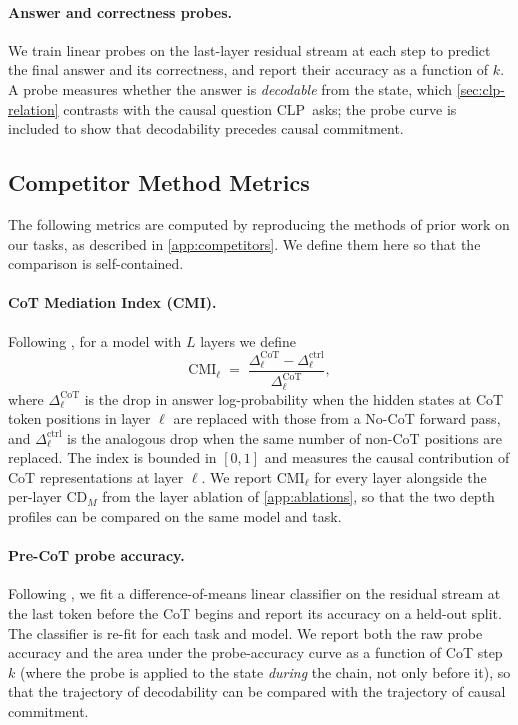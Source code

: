 \documentclass[11pt]{article}
\newcommand{\CDM}{\mathrm{CD}_{M}}
\newcommand{\stepk}{k}
\newcommand{\CLP}{\textsc{CLP}}
\begin{document}
\paragraph{Answer and correctness probes.} We train linear probes on the
last-layer residual stream at each step to predict the final answer and its
correctness, and report their accuracy as a function of $\stepk$. A probe
measures whether the answer is \emph{decodable} from the state, which
\cref{sec:clp-relation} contrasts with the causal question \CLP\ asks; the probe
curve is included to show that decodability precedes causal commitment.

\subsection{Competitor Method Metrics}
\label{app:metrics-competitors}

The following metrics are computed by reproducing the methods of prior work on
our tasks, as described in \cref{app:competitors}. We define them here so that
the comparison is self-contained.

\paragraph{CoT Mediation Index (CMI).}
Following \citet{DBLP:journals/corr/abs-2602-03994}, for a model with $L$ layers we define
\begin{equation}
\label{eq:cmi}
\mathrm{CMI}_{\ell} \;=\;
\frac{\Delta_{\ell}^{\mathrm{CoT}} - \Delta_{\ell}^{\mathrm{ctrl}}}
     {\Delta_{\ell}^{\mathrm{CoT}}},
\end{equation}
where $\Delta_{\ell}^{\mathrm{CoT}}$ is the drop in answer log-probability when
the hidden states at CoT token positions in layer $\ell$ are replaced with those
from a No-CoT forward pass, and $\Delta_{\ell}^{\mathrm{ctrl}}$ is the
analogous drop when the same number of non-CoT positions are replaced. The index
is bounded in $[0,1]$ and measures the causal contribution of CoT
representations at layer $\ell$. We report $\mathrm{CMI}_{\ell}$ for every layer
alongside the per-layer $\CDM$ from the layer ablation of
\cref{app:ablations}, so that the two depth profiles can be compared on the same
model and task.

\paragraph{Pre-CoT probe accuracy.}
Following \citet{DBLP:journals/corr/abs-2603-01437}, we fit a
difference-of-means linear classifier on the residual stream at the last token
before the CoT begins and report its accuracy on a held-out split.
The classifier is re-fit for each task and model. We report both the raw probe
accuracy and the area under the probe-accuracy curve as a function of CoT step
$\stepk$ (where the probe is applied to the state \emph{during} the chain, not
only before it), so that the trajectory of decodability can be compared with the
trajectory of causal commitment.
\end{document}
